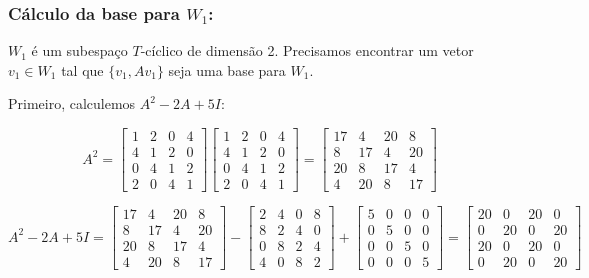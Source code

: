\subsubsection*{Cálculo da base para $W_1$:}

$W_1$ é um subespaço $T$-cíclico de dimensão 2. Precisamos encontrar um vetor $v_1 \in W_1$ tal que
$\{v_1, Av_1\}$ seja uma base para $W_1$.

Primeiro, calculemos $A^2 - 2A + 5I$:

\[
A^2 =
\begin{bmatrix}
1 & 2 & 0 & 4 \\
4 & 1 & 2 & 0 \\
0 & 4 & 1 & 2 \\
2 & 0 & 4 & 1
\end{bmatrix}
\begin{bmatrix}
1 & 2 & 0 & 4 \\
4 & 1 & 2 & 0 \\
0 & 4 & 1 & 2 \\
2 & 0 & 4 & 1
\end{bmatrix}
=
\begin{bmatrix}
17 & 4 & 20 & 8 \\
8 & 17 & 4 & 20 \\
20 & 8 & 17 & 4 \\
4 & 20 & 8 & 17
\end{bmatrix}
\]

\[
A^2 - 2A + 5I =
\begin{bmatrix}
17 & 4 & 20 & 8 \\
8 & 17 & 4 & 20 \\
20 & 8 & 17 & 4 \\
4 & 20 & 8 & 17
\end{bmatrix}
-
\begin{bmatrix}
2 & 4 & 0 & 8 \\
8 & 2 & 4 & 0 \\
0 & 8 & 2 & 4 \\
4 & 0 & 8 & 2
\end{bmatrix}
+
\begin{bmatrix}
5 & 0 & 0 & 0 \\
0 & 5 & 0 & 0 \\
0 & 0 & 5 & 0 \\
0 & 0 & 0 & 5
\end{bmatrix}
=
\begin{bmatrix}
20 & 0 & 20 & 0 \\
0 & 20 & 0 & 20 \\
20 & 0 & 20 & 0 \\
0 & 20 & 0 & 20
\end{bmatrix}
\]

